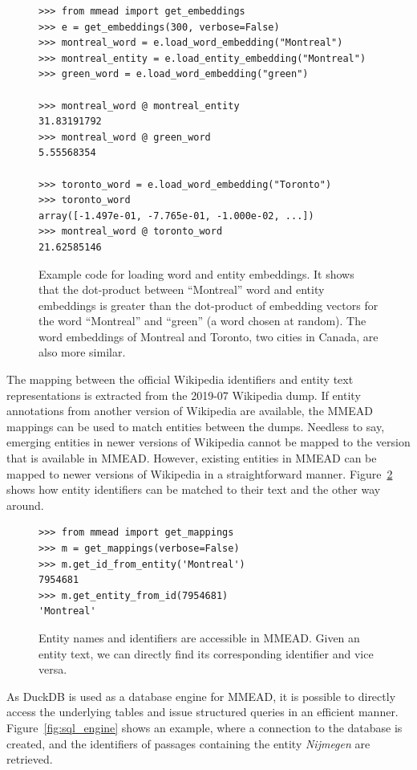 \begin{figure}
	\begin{verbatim}
>>> from mmead import get_embeddings
>>> e = get_embeddings(300, verbose=False)
>>> montreal_word = e.load_word_embedding("Montreal")
>>> montreal_entity = e.load_entity_embedding("Montreal")
>>> green_word = e.load_word_embedding("green")

>>> montreal_word @ montreal_entity
31.83191792
>>> montreal_word @ green_word
5.55568354

>>> toronto_word = e.load_word_embedding("Toronto")
>>> toronto_word
array([-1.497e-01, -7.765e-01, -1.000e-02, ...])
>>> montreal_word @ toronto_word
21.62585146
	\end{verbatim}
	\caption{Example code for loading word and entity embeddings. It shows that the dot-product between ``Montreal'' word and entity embeddings is greater than the dot-product of embedding vectors for the word ``Montreal'' and ``green'' (a word chosen at random). The word embeddings of Montreal and Toronto, two cities in Canada, are also more similar.}
	\label{fig:dot-product}
\end{figure}

The mapping between the official Wikipedia identifiers and entity text representations is extracted from the 2019-07 Wikipedia dump. If entity annotations from another version of Wikipedia are available, the MMEAD mappings can be used to match entities between the dumps. 
Needless to say, emerging entities in newer versions of Wikipedia cannot be mapped to the version that is available in MMEAD. However, existing entities in MMEAD can be mapped to newer versions of Wikipedia in a straightforward manner.
Figure~\ref{fig:load_mappings} shows how entity identifiers can be matched to their text and the other way around.  

\begin{figure}
	\begin{verbatim}
>>> from mmead import get_mappings
>>> m = get_mappings(verbose=False)
>>> m.get_id_from_entity('Montreal')
7954681
>>> m.get_entity_from_id(7954681)
'Montreal'
	\end{verbatim}
	\caption{Entity names and identifiers are accessible in MMEAD. Given an entity text, we can directly find its corresponding identifier and vice versa.}
	\label{fig:load_mappings}
\end{figure}

As DuckDB is used as a database engine for MMEAD, it is possible to directly access the underlying tables and issue structured queries in an efficient manner. Figure~\ref{fig:sql_engine} shows an example, where a connection to the database is created, and the identifiers of passages containing the entity \emph{Nijmegen} are retrieved.

